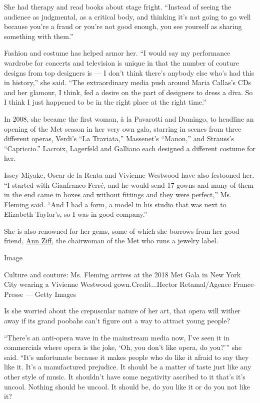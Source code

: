 She had therapy and read books about stage fright. ``Instead of seeing
the audience as judgmental, as a critical body, and thinking it's not
going to go well because you're a fraud or you're not good enough, you
see yourself as sharing something with them.''

Fashion and costume has helped armor her. ``I would say my performance
wardrobe for concerts and television is unique in that the number of
couture designs from top designers is --- I don't think there's anybody
else who's had this in history,'' she said. ``The extraordinary media
push around Maria Callas's CDs and her glamour, I think, fed a desire on
the part of designers to dress a diva. So I think I just happened to be
in the right place at the right time.''

In 2008, she became the first woman, à la Pavarotti and Domingo, to
headline an opening of the Met season in her very own gala, starring in
scenes from three different operas, Verdi's ``La Traviata,'' Massenet's
``Manon,'' and Strauss's ``Capriccio.'' Lacroix, Lagerfeld and Galliano
each designed a different costume for her.

Issey Miyake, Oscar de la Renta and Vivienne Westwood have also
festooned her. ``I started with Gianfranco Ferré, and he would send 17
gowns and many of them in the end came in boxes and without fittings and
they were perfect,'' Ms. Fleming said. ``And I had a form, a model in
his studio that was next to Elizabeth Taylor's, so I was in good
company.''

She is also renowned for her gems, some of which she borrows from her
good friend,
\href{https://www.nytimes3xbfgragh.onion/2018/10/17/arts/design/show-us-your-wall-ann-ziff.html}{Ann
Ziff}, the chairwoman of the Met who runs a jewelry label.

Image

Culture and couture: Ms. Fleming arrives at the 2018 Met Gala in New
York City wearing a Vivienne Westwood gown.Credit...Hector
Retamal/Agence France-Presse --- Getty Images

Is she worried about the crepuscular nature of her art, that opera will
wither away if its grand poobahs can't figure out a way to attract young
people?

``There's an anti-opera wave in the mainstream media now, I've seen it
in commercials where opera is the joke, `Oh, you don't like opera, do
you?''' she said. ``It's unfortunate because it makes people who do like
it afraid to say they like it. It's a manufactured prejudice. It should
be a matter of taste just like any other style of music. It shouldn't
have some negativity ascribed to it that's it's uncool. Nothing should
be uncool. It should be, do you like it or do you not like it?


